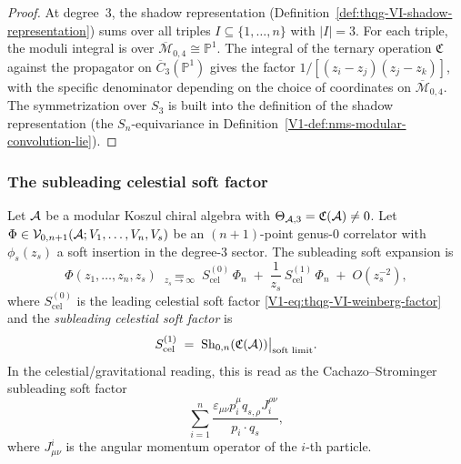 \begin{proof}
At degree~$3$, the shadow representation
(Definition~\ref{def:thqg-VI-shadow-representation}) sums over
all triples $I \subseteq \{1,\dotsc,n\}$ with $|I| = 3$.
For each triple, the moduli integral is over
$\overline{\mathcal{M}}_{0,4} \cong \mathbb{P}^1$.
The integral of the ternary operation $\mathfrak{C}$ against the
propagator on $\overline{C}_3(\mathbb{P}^1)$ gives the factor
$1/[(z_i - z_j)(z_j - z_k)]$, with the specific denominator
depending on the choice of coordinates on
$\overline{\mathcal{M}}_{0,4}$. The symmetrization over $S_3$
is built into the definition of the shadow representation
(the $S_n$-equivariance in
Definition~\ref{V1-def:nms-modular-convolution-lie}).
\end{proof}

\subsubsection{The subleading celestial soft factor}

\begin{theorem}
Let $\mathcal{A}$ be a modular Koszul chiral algebra with
\(\Theta_{\mathcal{A},3}=\mathfrak C(\mathcal{A})\neq0\).
Let $\Phi \in \mathcal{V}_{0,n+1}(\mathcal{A}; V_1, \dotsc, V_n, V_s)$ be an
$(n+1)$-point genus-$0$ correlator with $\phi_s(z_s)$ a soft
insertion in the degree-$3$ sector. The subleading soft expansion is
\begin{equation}%
\Phi(z_1, \dotsc, z_n, z_s)
\;\underset{z_s \to \infty}{=}\;
S^{(0)}_{\mathrm{cel}}\,\Phi_n
\;+\;
\frac{1}{z_s}\,S^{(1)}_{\mathrm{cel}}\,\Phi_n
\;+\; O(z_s^{-2}),
\end{equation}
where $S^{(0)}_{\mathrm{cel}}$ is the leading celestial soft factor
\eqref{V1-eq:thqg-VI-weinberg-factor} and the
\emph{subleading celestial soft factor} is
\begin{equation}%
S^{(1)}_{\mathrm{cel}}
\;=\;
\Sh_{0,n}(\mathfrak{C}(\cA))\bigl|_{\text{soft limit}}.
\end{equation}
In the celestial/gravitational reading, this is read as the
Cachazo--Strominger subleading soft factor
\[
\sum_{i=1}^{n}
\frac{\varepsilon_{\mu\nu}p_i^\mu q_{s,\rho}J_i^{\rho\nu}}
     {p_i \cdot q_s},
\]
where $J^i_{\mu\nu}$ is the angular momentum operator of the
$i$-th particle.
\end{theorem}

